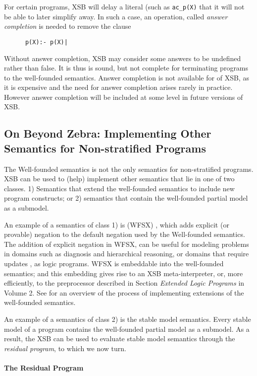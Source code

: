 For certain programs, XSB will delay a literal (such as {\tt ac\_p(X)}
that it will not be able to later simplify away.  In such a case, an
operation, called {\em answer completion} is needed to remove the
clause
\begin{verbatim}
      p(X):- p(X)|
\end{verbatim}
Without answer completion, XSB may consider some answers to be
undefined rather than false.  It is thus is sound, but not complete
for terminating programs to the well-founded semantics.  Answer
completion is not available for \version{} of XSB, as it is expensive
and the need for answer completion arises rarely in practice.  However
answer completion will be included at some level in future versions of
XSB\@.

\subsection{On Beyond Zebra: Implementing Other Semantics for
Non-stratified Programs}

The Well-founded semantics is not the only semantics for
non-stratified programs.  XSB can be used to (help) implement other
semantics that lie in one of two classes.  1) Semantics that extend
the well-founded semantics to include new program constructs; or 2)
semantics that contain the well-founded partial model as a submodel.

An example of a semantics of class 1) is (WFSX) \cite{ADP95}, which
adds explicit (or provable) negation to the default negation used by
the Well-founded semantics.  The addition of explicit negation in
WFSX, can be useful for modeling problems in domains such as diagnosis
and hierarchical reasoning, or domains that require updates
\cite{LePe98}, as logic programs.  WFSX is embeddable into the
well-founded semantics; and this embedding gives rise to an XSB
meta-interpreter, or, more efficiently, to the preprocessor described
in Section {\it Extended Logic Programs} in Volume 2.  See
\cite{Swif99a} for an overview of the process of implementing
extensions of the well-founded semantics.

An example of a semantics of class 2) is the stable model semantics.
Every stable model of a program contains the well-founded partial
model as a submodel.  As a result, the XSB can be used to evaluate
stable model semantics through the {\em residual program}, to which we
now turn.

\paragraph*{The Residual Program}

